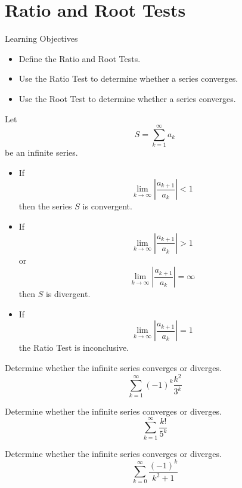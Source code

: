 \documentclass[compacto,10pt,comentarios]{aleph-notas}
\begin{document}
\encabezado
\section*{Ratio and Root Tests}
\begin{mdframed}
    \center Learning Objectives \\
    \begin{itemize}
        \item Define the Ratio and Root Tests.
        \item Use the Ratio Test to determine whether a series converges.
        \item Use the Root Test to determine whether a series converges.
    \end{itemize}
\end{mdframed}

\begin{defi}
    Let
    $$
        S = \sum_{k=1}^{\infty} a_k
    $$
    be an infinite series.
    \begin{itemize}
        \item If
            $$
                \lim_{k \to \infty} \left| \frac{a_{k + 1}}{a_k} \right| < 1
            $$
            then the series $S$ is convergent.
        \item If
            $$
                \lim_{k \to \infty} \left| \frac{a_{k+1}}{a_k} \right| > 1
            $$
            or
            $$
                \lim_{k \to \infty} \left| \frac{a_{k+1}}{a_k} \right| = \infty
            $$
            then $S$ is divergent.
        \item If
            $$
                \lim_{k \to \infty} \left| \frac{a_{k+1}}{a_k}\right| = 1
            $$
            the Ratio Test is inconclusive. 
    \end{itemize}
\end{defi}

\begin{ejer}
    Determine whether the infinite series converges or diverges.
    $$
        \sum_{k=1}^{\infty} (-1)^{k} \frac{k^2}{3^k}
    $$
\end{ejer}

\begin{ejer}
    Determine whether the infinite series converges or diverges.
    $$
        \sum_{k=1}^{\infty} \frac{k!}{5^k}
    $$
\end{ejer}

\begin{ejer}
    Determine whether the infinite series converges or diverges.
    $$
        \sum_{k=0}^{\infty} \frac{(-1)^k}{k^2+1}
    $$
\end{ejer}
\end{document}
